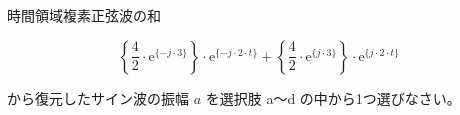 時間領域複素正弦波の和

\[
\left \{ \frac{4}{2} \cdot \textrm{e}^{\{-j \cdot 3 \}} \right \} \cdot \textrm{e}^{\{-j \cdot 2 \cdot t \}} +  
\left \{ \frac{4}{2} \cdot \textrm{e}^{\{ j \cdot 3 \}} \right \} \cdot \textrm{e}^{\{ j \cdot 2 \cdot t \}}
\]

\bigskip
\noindent から復元したサイン波の振幅 $a$ を選択肢 a〜d の中から1つ選びなさい。

